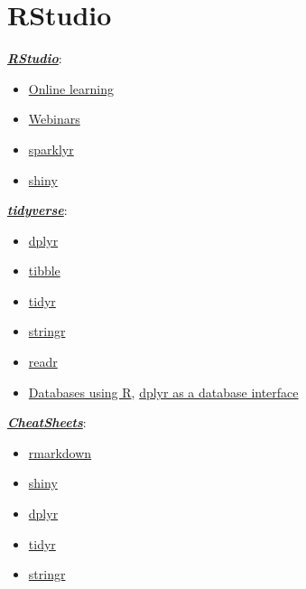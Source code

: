 \documentclass[
]{book}
\theoremstyle{break}
\begin{document}
\hypertarget{rstudio-links}{%
\section{RStudio}\label{rstudio-links}}

\href{https://www.rstudio.com}{\textbf{\emph{RStudio}}}:

\begin{itemize}
\item
  \href{https://www.rstudio.com/online-learning}{Online learning}
\item
  \href{https://resources.rstudio.com/webinars}{Webinars}
\item
  \href{https://spark.rstudio.com/}{sparklyr}
\item
  \href{http://shiny.rstudio.com}{shiny}
\end{itemize}

\href{https://www.tidyverse.org/}{\textbf{\emph{tidyverse}}}:

\begin{itemize}
\item
  \href{https://dplyr.tidyverse.org}{dplyr}
\item
  \href{https://tibble.tidyverse.org}{tibble}
\item
  \href{https://tidyr.tidyverse.org}{tidyr}
\item
  \href{https://stringr.tidyverse.org}{stringr}
\item
  \href{https://readr.tidyverse.org}{readr}
\item
  \href{https://db.rstudio.com}{Databases using R},
  \href{https://db.rstudio.com/overview}{dplyr as a database interface}
\end{itemize}

\href{https://resources.rstudio.com/rstudio-cheatsheets}{\textbf{\emph{CheatSheets}}}:

\begin{itemize}
\item
  \href{https://resources.rstudio.com/rstudio-cheatsheets/rmarkdown-2-0-cheat-sheet}{rmarkdown}
\item
  \href{https://resources.rstudio.com/rstudio-cheatsheets/shiny-cheat-sheet}{shiny}
\item
  \href{https://github.com/rstudio/cheatsheets/blob/master/data-transformation.pdf}{dplyr}
\item
  \href{https://github.com/rstudio/cheatsheets/blob/master/data-import.pdf}{tidyr}
\item
  \href{https://resources.rstudio.com/rstudio-cheatsheets/stringr-cheat-sheet}{stringr}
\end{itemize}
\end{document}
